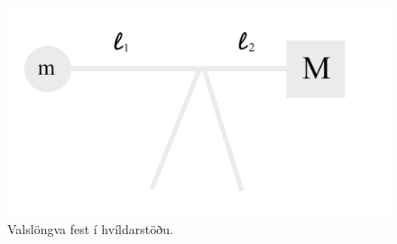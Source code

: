 \begin{enumerate}[label = \textbf{Dæmi \thechapter.\arabic*.}]
\begin{figure}[ht]
\begin{minipage}[b]{0.45\linewidth}
    \centering
    \includegraphics[scale=0.65]{images/massistong.png}
    \caption{Valslöngva fest í hvíldarstöðu.}
    \label{rest}
\end{minipage}
\hspace{0.5cm}
\begin{minipage}[b]{0.65\linewidth}
    \centering

\end{minipage}
\end{figure}
\end{enumerate}
